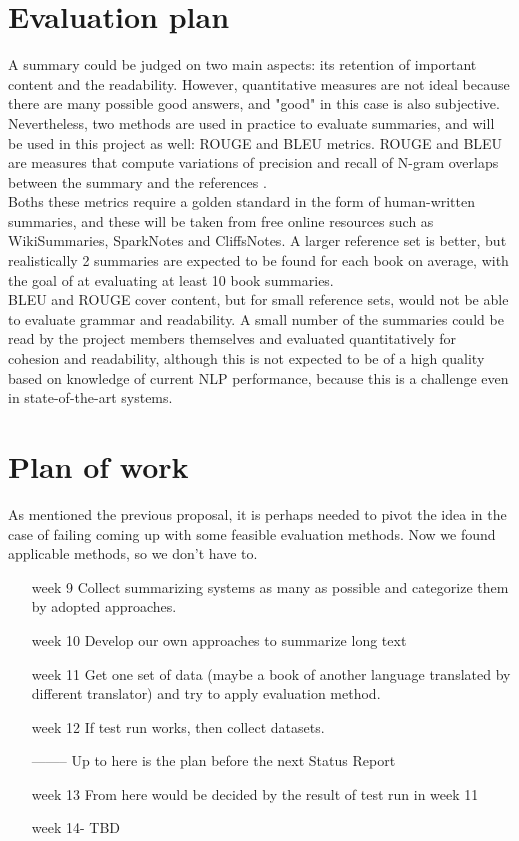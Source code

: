 \section{Evaluation plan}
A summary could be judged on two main aspects: its retention of important content and the readability. However, quantitative measures are not ideal because there are many possible good answers, and "good" in this case is also subjective. Nevertheless, two methods are used in practice to evaluate summaries, and will be used in this project as well: ROUGE and BLEU metrics. ROUGE and BLEU are measures that compute variations of precision and recall of N-gram overlaps between the summary and the references \cite{nenkova2006summarization} \cite{lin2004rouge}. \\
Boths these metrics require a golden standard in the form of human-written summaries, and these will be taken from free online resources such as WikiSummaries, SparkNotes and CliffsNotes. A larger reference set is better, but realistically 2 summaries are expected to be found for each book on average, with the goal of at evaluating at least 10 book summaries. \\
BLEU and ROUGE cover content, but for small reference sets, would not be able to evaluate grammar and readability. A small number of the summaries could be read by the project members themselves and evaluated quantitatively for cohesion and readability, although this is not expected to be of a high quality based on knowledge of current NLP performance, because this is a challenge even in state-of-the-art systems.

\section{Plan of work}
As mentioned the previous proposal, it is perhaps needed to pivot the idea in the case of failing coming up with some feasible evaluation methods. Now we found applicable methods, so we don't have to.

\begin{enumerate}
  \item[week 9] Collect summarizing systems as many as possible and categorize them by adopted approaches.
  \item[week 10] Develop our own approaches to summarize long text
  \item[week 11] Get one set of data (maybe a book of another language translated by different translator) and try to apply evaluation method.
  \item[week 12] If test run works, then collect datasets. 
  \item [--------] Up to here is the plan before the next Status Report
  \item[week 13] From here would be decided by the result of test run in week 11
  \item[week 14-] TBD
\end{enumerate}

